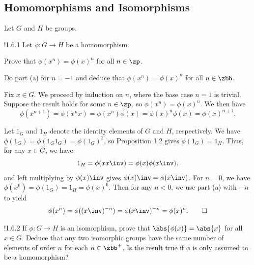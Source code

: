 \subsection{Homomorphisms and Isomorphisms}

Let $G$ and $H$ be groups.

\begin{exercise}!{1.6.1}
    Let $\phi \colon G \to H$ be a homomorphism.
    \begin{subexercises}
        \item Prove that $\phi(x^n) = \phi(x)^n$ for all $n \in \zp$.
        \item Do part (a) for $n = - 1$ and deduce that $\phi(x^n) = \phi(x)^n$ for all $n \in \zbb$.
    \end{subexercises}
\end{exercise}

\begin{solenum}
    \item Fix $x \in G$.
    We proceed by induction on $n$, where the base case $n = 1$ is trivial.
	Suppose the result holds for some $n \in \zp$, so $\phi(x^n) = \phi(x)^n$.
    We then have
    \[
    	\phi(x^{n + 1}) = \phi(x^nx) = \phi(x^n)\phi(x) = \phi(x)^n\phi(x) = \phi(x)^{n + 1}.
    \]
    \item Let $1_G$ and $1_H$ denote the identity elements of $G$ and $H$, respectively.
    We have $\phi(1_G) = \phi(1_G1_G) = \phi(1_G)^2$, so Proposition 1.2 gives $\phi(1_G) = 1_H$.
    Thus, for any $x \in G$, we have
    \[
        1_H = \phi(xx\inv) = \phi(x)\phi(x\inv),
    \]
    and left multiplying by $\phi(x)\inv$ gives $\phi(x)\inv = \phi(x\inv)$.
    For $n = 0$, we have $\phi(x^0) = \phi(1_G) = 1_H = \phi(x)^0$.
    Then for any $n < 0$, we use part (a) with $-n$ to yield
    \[
        \phi(x^n) = \phi((x\inv)^{-n}) = \phi(x\inv)^{-n} = \phi(x)^n. \qedhere
    \]
\end{solenum}

\begin{exercise}!{1.6.2}
    If $\phi \colon G \to H$ is an isomorphism, prove that $\abs{\phi(x)} = \abs{x}$ for all $x \in G$.
	Deduce that any two isomorphic groups have the same number of elements of order $n$ for each $n \in \zbb^+$.
	Is the result true if $\phi$ is only assumed to be a homomorphism?
\end{exercise}

